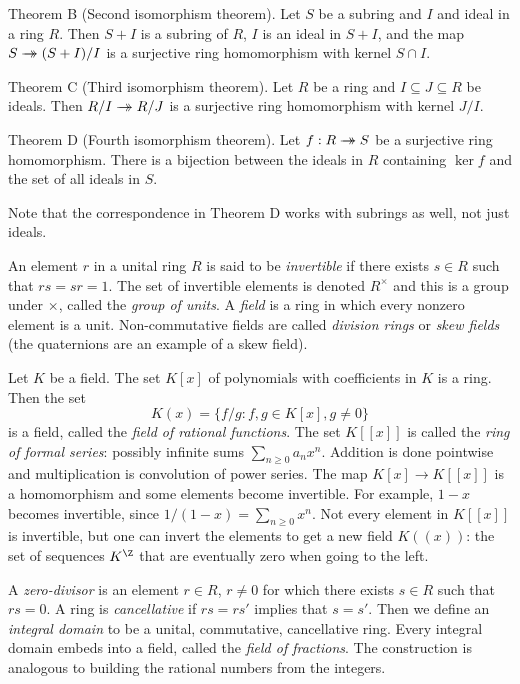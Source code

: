 \parenproclaim Theorem B (Second isomorphism theorem). Let $S$ be a subring and $I$ and ideal in a ring $R$. Then $S+I$ is a subring of $R$, $I$ is an ideal in $S+I$, and the map $S \rightarrow\!\!\!\!\!\rightarrow (S+I)/I$ is a surjective ring homomorphism with kernel $S\cap I$.\slug

\parenproclaim Theorem C (Third isomorphism theorem). Let $R$ be a ring and $I\subseteq J\subseteq R$ be ideals. Then $R/I \rightarrow\!\!\!\!\!\rightarrow R/J$ is a surjective ring homomorphism with kernel $J/I$.\slug

\parenproclaim Theorem D (Fourth isomorphism theorem). Let $f:R\rightarrow\!\!\!\!\!\rightarrow S$ be a surjective ring homomorphism. There is a bijection between the ideals in $R$ containing $\ker f$ and the set of all ideals in $S$.\slug

Note that the correspondence in Theorem D works with subrings as well, not just ideals.

An element $r$ in a unital ring $R$ is said to be {\it invertible} if there exists $s\in R$ such that $rs = sr = 1$. The set of invertible elements is denoted $R^\times$ and this is a group under $\times$, called the {\it group of units}. A {\it field} is a ring in which every nonzero element is a unit. Non-commutative fields are called {\it division rings} or {\it skew fields} (the quaternions are an example of a skew field).

Let $K$ be a field. The set $K[x]$ of polynomials with coefficients in $K$ is a ring. Then the set
$$K(x) = \{ f / g : f,g\in K[x], g\neq 0\}$$
is a field, called the {\it field of rational functions}. The set $K[[x]]$ is called the {\it ring of formal series}: possibly infinite sums $\sum_{n\geq 0} a_nx^n$. Addition is done pointwise and multiplication is convolution of power series. The map $K[x] \to K[[x]]$ is a homomorphism and some elements become invertible. For example, $1-x$ becomes invertible, since $1/(1-x) = \sum_{n\geq 0} x^n$. Not every element in $K[[x]]$ is invertible, but one can invert the elements to get a new field $K((x))$: the set of sequences $K^\Z$ that are eventually zero when going to the left.

A {\it zero-divisor} is an element $r\in R$, $r\neq 0$ for which there exists $s\in R$ such that $rs = 0$. A ring is {\it cancellative} if $rs = rs'$ implies that $s = s'$. Then we define an {\it integral domain} to be a unital, commutative, cancellative ring. Every integral domain embeds into a field, called the {\it field of fractions}. The construction is analogous to building the rational numbers from the integers.

